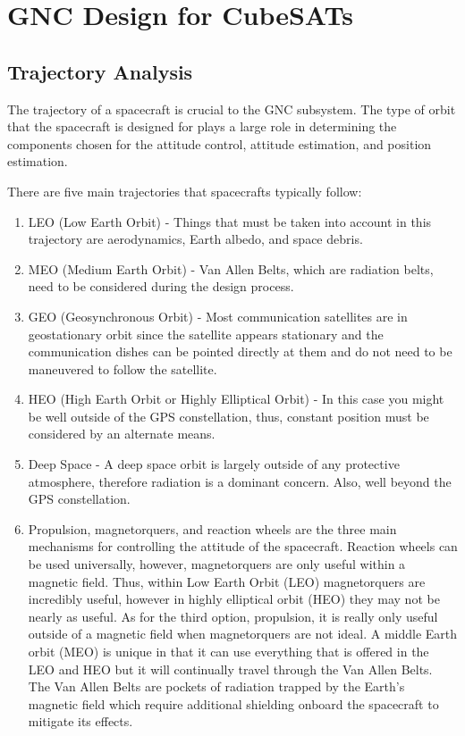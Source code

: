 
\section{GNC Design for CubeSATs}

\subsection{Trajectory Analysis}

The trajectory of a spacecraft is crucial to the GNC subsystem. The
type of orbit that the spacecraft is designed for plays a large role
in determining the components chosen for the attitude control,
attitude estimation, and position estimation.  

There are five main trajectories that spacecrafts typically follow:
\begin{enumerate}[itemsep=-5pt]
\item LEO  (Low Earth Orbit) - Things that must be taken into account
  in this trajectory are aerodynamics, Earth albedo, and space
  debris. 
\item MEO (Medium Earth Orbit) - Van Allen Belts, which are radiation
  belts, need to be considered during the design process. 
\item GEO (Geosynchronous Orbit) - Most communication satellites are
  in geostationary orbit since the satellite appears stationary and
  the communication dishes can be pointed directly at them and do not
  need to be maneuvered to follow the satellite. 
\item HEO (High Earth Orbit or Highly Elliptical Orbit) - In this case
  you might be well outside of the GPS constellation, thus, constant
  position must be considered by an alternate means. 
\item Deep Space - A deep space orbit is largely outside of any
  protective atmosphere, therefore radiation is a dominant
  concern. Also, well beyond the GPS constellation. 
\item Propulsion, magnetorquers, and reaction wheels are the three
  main mechanisms for controlling the attitude of the
  spacecraft. Reaction wheels can be used universally, however,
  magnetorquers are only useful within a magnetic field. Thus, within
  Low Earth Orbit (LEO) magnetorquers are incredibly useful, however
  in highly elliptical orbit (HEO) they may not be nearly as
  useful. As for the third option, propulsion, it is really only
  useful outside of a magnetic field when magnetorquers are not
  ideal. A middle Earth orbit (MEO) is unique in that it can use
  everything that is offered in the LEO and HEO but it will
  continually travel through the Van Allen Belts. The Van Allen Belts
  are pockets of radiation trapped by the Earth’s magnetic field which
  require additional shielding onboard the spacecraft to mitigate its
  effects.
\end{enumerate}

